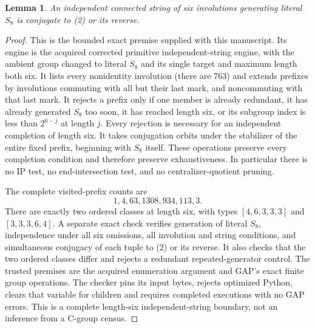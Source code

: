 \documentclass[11pt,a4paper]{article}
\newtheorem{lemma}{Lemma}
\begin{document}
\begin{lemma}\label{eight}
An independent connected string of six involutions generating
literal $S_8$ is conjugate to (2) or its reverse.
\end{lemma}
\begin{proof}
This is the bounded exact premise supplied with this manuscript.
Its engine is the acquired corrected primitive independent-string
engine, with the ambient group changed to literal $S_8$ and its
single target and maximum length both six. It lists every
nonidentity involution (there are 763) and extends prefixes by
involutions commuting with all but their last mark, and
noncommuting with that last mark. It rejects a prefix only if
one member is already redundant, it has already generated
$S_8$ too soon, it has reached length six, or its subgroup
index is less than $2^{6-j}$ at length $j$. Every rejection
is necessary for an independent completion of length six.
It takes conjugation orbits under the stabilizer of the entire
fixed prefix, beginning with $S_8$ itself. These operations
preserve every completion condition and therefore preserve
exhaustiveness. In particular there is no IP test, no
end-intersection test, and no centralizer-quotient pruning.

The complete visited-prefix counts are
\[
                  1,4,63,1308,934,113,3.
\]
There are exactly two ordered classes at length six, with
types $[4,6,3,3,3]$ and $[3,3,3,6,4]$. A separate exact
check verifies generation of literal $S_8$, independence
under all six omissions, all involution and string conditions,
and simultaneous conjugacy of each tuple to (2) or its
reverse. It also checks that the two ordered classes differ
and rejects a redundant repeated-generator control.
The trusted premises are the acquired enumeration argument
and GAP's exact finite group operations. The checker pins
its input bytes, rejects optimized Python, clears that variable
for children and requires completed executions with no GAP
errors. This is a complete length-six independent-string
boundary, not an inference from a C-group census.
\end{proof}
\end{document}
